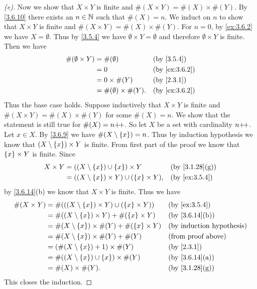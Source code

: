 \begin{proof}[(e)]
	Now we show that \(X \times Y\) is finite and \(\#(X \times Y) = \#(X) \times \#(Y)\).
	By \cref{3.6.10} there exists an \(n \in \mathbb{N}\) such that \(\#(X) = n\).
	We induct on \(n\) to show that \(X \times Y\) is finite and \(\#(X \times Y) = \#(X) \times \#(Y)\).
	For \(n = 0\), by \cref{ex:3.6.2} we have \(X = \emptyset\).
	Thus by \cref{3.5.4} we have \(\emptyset \times Y = \emptyset\) and therefore \(\emptyset \times Y\) is finite.
	Then we have
	\begin{align*}
		\#(\emptyset \times Y) & = \#(\emptyset)               &  & \by{3.5.4}    \\
		                       & = 0                           &  & \by{ex:3.6.2} \\
		                       & = 0 \times \#(Y)              &  & \by{2.3.1}    \\
		                       & = \#(\emptyset) \times \#(Y). &  & \by{ex:3.6.2}
	\end{align*}
	Thus the base case holds.
	Suppose inductively that \(X \times Y\) is finite and \(\#(X \times Y) = \#(X) \times \#(Y)\) for some \(\#(X) = n\).
	We show that the statement is still true for \(\#(X) = n{+}\!{+}\).
	So let \(X\) be a set with cardinality \(n{+}\!{+}\).
	Let \(x \in X\).
	By \cref{3.6.9} we have \(\#(X \setminus \left\lbrace x\right\rbrace) = n\).
	Thus by induction hypothesis we know that \((X \setminus \left\lbrace x\right\rbrace) \times Y\) is finite.
	From first part of the proof we know that \(\left\lbrace x\right\rbrace \times Y\) is finite.
	Since
	\begin{align*}
		X \times Y & = ((X \setminus \set{x}) \cup \set{x}) \times Y             &  & \by{3.1.28}[g] \\
		           & = ((X \setminus \set{x}) \times Y) \cup (\set{x} \times Y), &  & \by{ex:3.5.4}
	\end{align*}
	by \cref{3.6.14}(b) we know that \(X \times Y\) is finite.
	Thus we have
	\begin{align*}
		\#(X \times Y) & = \#(((X \setminus \set{x}) \times Y) \cup (\set{x} \times Y)) &  & \by{ex:3.5.4}             \\
		               & = \#((X \setminus \set{x}) \times Y) + \#(\set{x} \times Y)    &  & \by{3.6.14}[b]            \\
		               & = \#(X \setminus \set{x}) \times \#(Y) + \#(\set{x} \times Y)  &  & \byIH                     \\
		               & = \#(X \setminus \set{x}) \times \#(Y) + \#(Y)                 &  & \text{(from proof above)} \\
		               & = (\#(X \setminus \set{x}) + 1) \times \#(Y)                   &  & \by{2.3.1}                \\
		               & = \#((X \setminus \set{x}) \cup \set{x}) \times \#(Y)          &  & \by{3.6.14}[a]            \\
		               & = \#(X) \times \#(Y).                                          &  & \by{3.1.28}[g]
	\end{align*}
	This closes the induction.
\end{proof}


